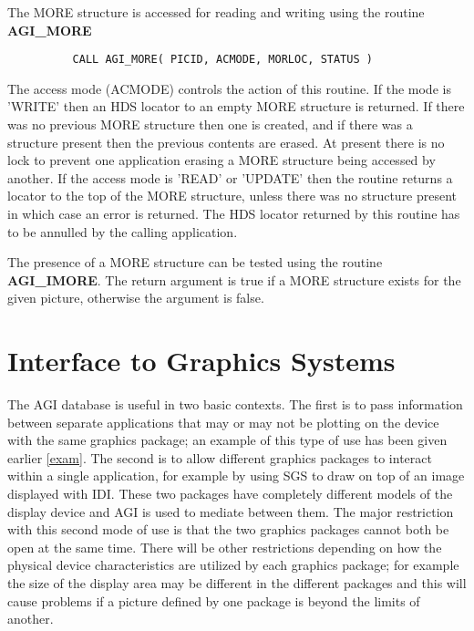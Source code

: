 The MORE structure is accessed for reading and writing using the routine
{\bf AGI\_MORE}
\begin{verbatim}
          CALL AGI_MORE( PICID, ACMODE, MORLOC, STATUS )
\end{verbatim}
The access mode (ACMODE) controls the action of this routine. If the mode
is 'WRITE' then an HDS locator to an empty MORE structure is returned. If
there was no previous MORE structure then one is created, and if there was
a structure present then the previous contents are erased. At present
there is no lock to prevent one application erasing a MORE structure being
accessed by another. If the access mode is 'READ' or 'UPDATE' then the
routine returns a locator to the top of the MORE structure, unless there
was no structure present in which case an error is returned. The HDS
locator returned by this routine has to be annulled by the calling
application.

The presence of a MORE structure can be tested using the routine
{\bf AGI\_IMORE}. The return argument is true if a MORE structure exists
for the given picture, otherwise the argument is false.


\section {Interface to Graphics Systems}

The AGI database is useful in two basic contexts. The first is to pass
information between separate applications that may or may not be plotting
on the device with the same graphics package; an example of this type of
use has been given earlier \ref{exam}. The second is to allow
different graphics packages to interact within a single application, for
example by using SGS to draw on top of an image displayed with IDI. These
two packages have completely different models of the display device and
AGI is used to mediate between them. The major restriction with this second
mode of use is that the two graphics packages cannot both be open at the
same time. There will be other restrictions depending on how the physical
device characteristics are utilized by each graphics package; for example
the size of the display area may be different in the different packages and
this will cause problems if a picture defined by one package is beyond the
limits of another.

